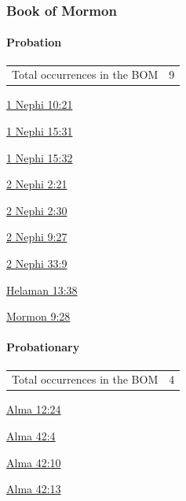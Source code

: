 	\subsubsection{Book of Mormon} %
		\label{PROBATION-BOM}
		
		\paragraph{Probation}
	
			\begin{tabular}{ll}
				Total occurrences in the BOM & 9
			\end{tabular}
			
			\begin{compactdesc}
				\item[{\hyperref[1NEPHI-10-21]{1 Nephi 10:21}}] 
				\item[{\hyperref[1NEPHI-15-31]{1 Nephi 15:31}}]
				\item[{\hyperref[1NEPHI-15-32]{1 Nephi 15:32}}]
				\item[{\hyperref[2NEPHI-2-21]{2 Nephi 2:21}}]
				\item[{\hyperref[2NEPHI-2-30]{2 Nephi 2:30}}]
				\item[{\hyperref[2NEPHI-9-27]{2 Nephi 9:27}}]
				\item[{\hyperref[2NEPHI-33-9]{2 Nephi 33:9}}]
				\item[{\hyperref[HELAMAN-13-18]{Helaman 13:38}}]
				\item[{\hyperref[MORMON-9-28]{Mormon 9:28}}]
			\end{compactdesc}
			
		\paragraph{Probationary}
	
			\begin{tabular}{ll}
				Total occurrences in the BOM & 4
			\end{tabular}
			
			\begin{compactdesc}
				\item[{\hyperref[ALMA-12-24]{Alma 12:24}}]
				\item[{\hyperref[ALMA-42-4]{Alma 42:4}}]
				\item[{\hyperref[ALMA-42-10]{Alma 42:10}}]
				\item[{\hyperref[ALMA-42-13]{Alma 42:13}}]
			\end{compactdesc}
		
